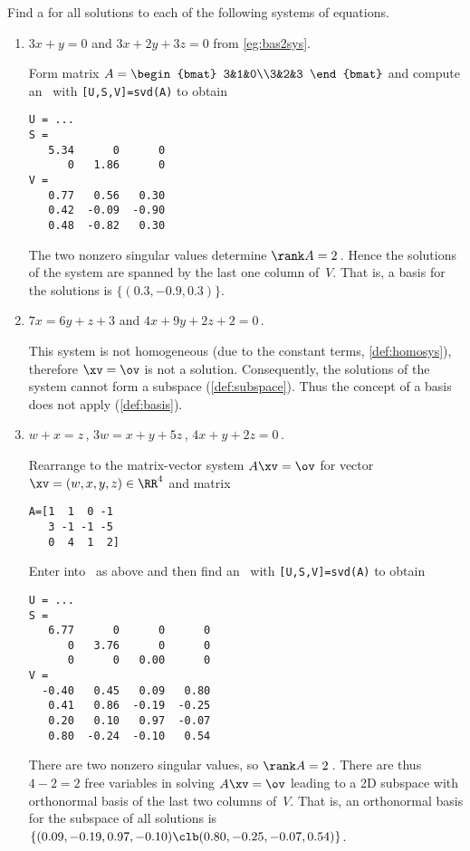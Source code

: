 \begin{example} 
Find a  for all solutions to each of the following systems of equations.
\begin{enumerate}
\item \(3x+y=0\) and \(3x+2y+3z=0\) from \cref{eg:bas2sys}.
\begin{solution} 
Form matrix \(A=\begin{bmat} 3&1&0\\3&2&3 \end{bmat}\) and compute an \svd\ with \verb|[U,S,V]=svd(A)| to obtain \twodp
\begin{verbatim}
U = ...
S =
   5.34      0      0
      0   1.86      0
V =
   0.77   0.56   0.30
   0.42  -0.09  -0.90
   0.48  -0.82   0.30
\end{verbatim}
The two nonzero singular values determine \(\rank A=2\)\,.
Hence the solutions of the system are spanned by the last one column of~\(V\).  
That is, a basis for the solutions is \(\{(0.3,-0.9,0.3)\}\).
\end{solution}

\item \(7x=6y+z+3\) and \(4x+9y+2z+2=0\)\,.
\begin{solution} 
This system is not homogeneous (due to the constant terms, \cref{def:homosys}), therefore \(\xv=\ov\) is not a solution. Consequently, the solutions of the system cannot form a subspace (\cref{def:subspace}). 
Thus the concept of a basis does not apply (\cref{def:basis}). 
\end{solution}


\item \(w+x=z\)\,,
\(3w=x+y+5z\)\,,
\(4x+y+2z=0\)\,.
\begin{solution} 
Rearrange to the matrix-vector system \(A\xv=\ov\) for vector \(\xv=(w,x,y,z)\in\RR^4\) and matrix
\begin{verbatim}
A=[1  1  0 -1
   3 -1 -1 -5
   0  4  1  2]
\end{verbatim}
\setbox\ajrqrbox\hbox{}%
\marginajrbox%
Enter into \script\ as above and then find an \svd\ with \verb|[U,S,V]=svd(A)| to obtain \twodp
\begin{verbatim}
U = ...
S =
   6.77      0      0      0
      0   3.76      0      0
      0      0   0.00      0
V =
  -0.40   0.45   0.09   0.80
   0.41   0.86  -0.19  -0.25
   0.20   0.10   0.97  -0.07
   0.80  -0.24  -0.10   0.54
\end{verbatim}
There are two nonzero singular values, so \(\rank A=2\)\,.
There are thus \(4-2=2\) free variables in solving \(A\xv=\ov\) leading to a 2D subspace with orthonormal basis of the last two columns of~\(V\).
That is, an orthonormal basis for the subspace of all solutions is \(\{(0.09,-0.19,0.97,-0.10)\clb (0.80,-0.25,-0.07,0.54)\}\). 
\end{solution}

\end{enumerate}
\end{example}







